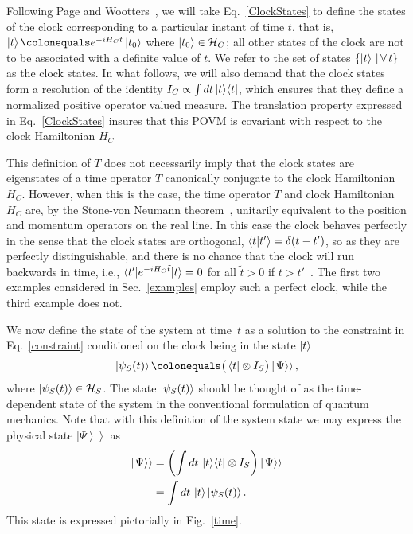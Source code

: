 \documentclass[a4paper,twocolumn,superscriptaddress,11pt,accepted=2019-06-04]{quantumarticle}
\newcommand{\ce}{\colonequals}
\newcommand{\kket}[1]{\left| \left. #1 \right> \right>} 		%
\newcommand{\nn}{\nonumber}		%
\begin{document}
{Following Page and Wootters~\cite{Page:1983, Wootters:1984}, we will take Eq.~\eqref{ClockStates} to define the states of the clock corresponding to a particular instant of time $t$, that is, $\ket{t}\ce e^{-iH_Ct} \ket{t_0}$ where $\ket{t_0} \in \mathcal{H}_C$; all other states of the clock are not to be associated with a definite value of $t$. We refer to the set of states $\{ \ket{t} \, | \, \forall \, t\}$ as the clock states. In what follows, we will also demand that the clock states form a resolution of the identity $I_C \propto \int dt \ket{t}\!\bra{t}$, which ensures that they define a normalized positive operator valued measure. The translation property expressed in Eq.~\eqref{ClockStates} insures that this POVM is covariant with respect to the clock Hamiltonian $H_C$~\cite{holevoProbabilisticStatisticalAspects1982, Braunstein:1994, Busch:1995, Braunstein:1996}


This definition of $T$ does not necessarily imply that the clock states are eigenstates of a time operator $T$ canonically conjugate to the clock Hamiltonian $H_C$.  However, when this is the case, the time operator $T$ and clock Hamiltonian $H_C$ are, by the Stone-von Neumann theorem~\cite{Hall:2013}, unitarily equivalent to the position and momentum operators on the real line. In this case the clock behaves perfectly in the sense that the clock states are orthogonal, $\braket{t | t'} = \delta (t-t')$, so as they are perfectly distinguishable, and there is no chance that the clock will run backwards in time, i.e., $\braket{t'| e^{-iH_C \tilde{t}} |t} = 0$ for all $\tilde{t}>0$ if $t>t'$~\cite{Isham1993,Unruh:1989, Dolby2004}. The first two examples considered in Sec.~\ref{examples} employ such a perfect clock, while the third example does not.


We now define the state of the system at time~$t$ as a solution to the constraint in Eq.~\eqref{constraint}  conditioned on the clock being in the state $\ket{t}$
\begin{align}
\ket{\psi_S(t)} \ce  \big( \bra{t} \otimes I_S\big) \kket{\Psi}, \label{SystemState}
\end{align}
where $\ket{\psi_S(t)} \in \mathcal{H}_S$. The state $\ket{\psi_S(t)}$ should be thought of as the time-dependent state of the system in the conventional formulation of quantum mechanics. Note that with this definition of the system state we may express the physical state $\kket{\Psi}$ as
\begin{align}
\kket{\Psi} &= \left(  \int dt \, \ket{t}\!\bra{t} \otimes I_S \right) \kket{\Psi} \nn \\
&= \int dt \, \ket{t} \ket{\psi_S(t)}. \label{entangledPhysicalState}
\end{align}
This state is expressed pictorially in Fig.~\ref{time}.

}
\end{document}
